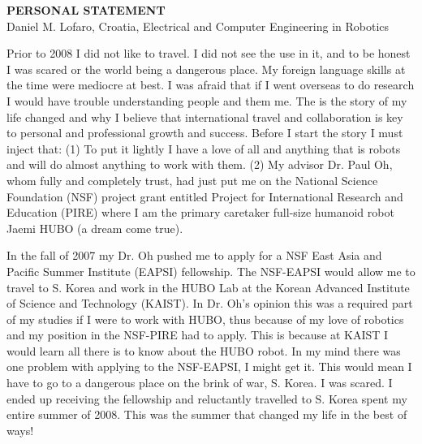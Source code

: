 \documentclass[12pt]{article}
\begin{document}
\begin{center}
\textbf{PERSONAL STATEMENT}\\
Daniel M. Lofaro, Croatia, Electrical and Computer Engineering in Robotics\\

\end{center}

\normalsize
Prior to 2008 I did not like to travel. 
I did not see the use in it, and to be honest I was scared or the world being a dangerous place.  
My foreign language skills at the time were mediocre at best.  
I was afraid that if I went overseas to do research I would have trouble understanding people and them me.  
The is the story of my life changed and why I believe that international travel and collaboration is key to personal and professional growth and success.
Before I start the story I must inject that: 
(1) To put it lightly I have a love of all and anything that is robots and will do almost anything to work with them.  
(2) My advisor Dr. Paul Oh, whom fully and completely trust, had just put me on the National Science Foundation (NSF) project grant entitled Project for International Research and Education (PIRE) where I am the primary caretaker full-size humanoid robot Jaemi HUBO (a dream come true).  

In the fall of 2007 my Dr. Oh pushed me to apply for a NSF East Asia and Pacific Summer Institute (EAPSI) fellowship.  
The NSF-EAPSI would allow me to travel to S. Korea and work in the HUBO Lab at the Korean Advanced Institute of Science and Technology (KAIST).  
In Dr. Oh's opinion this was a required part of my studies if I were to work with HUBO, thus because of my love of robotics and my position in the NSF-PIRE had to apply.
This is because at KAIST I would learn all there is to know about the HUBO robot.
In my mind there was one problem with applying to the NSF-EAPSI, I might get it.
This would mean I have to go to a dangerous place on the brink of war, S. Korea.
I was scared.  
I ended up receiving the fellowship and reluctantly travelled to S. Korea spent my entire summer of 2008.  
This was the summer that changed my life in the best of ways!  

\end{document}
